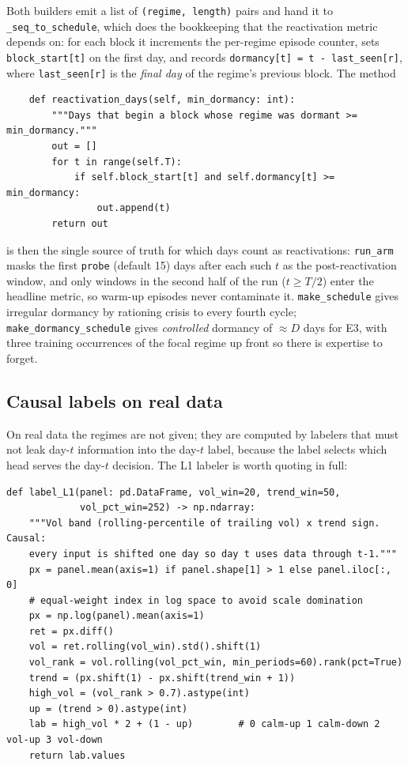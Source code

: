 \documentclass[11pt,a4paper]{article}
\theoremstyle{definition}
\theoremstyle{plain}
\begin{document}
Both builders emit a list of \texttt{(regime, length)} pairs and hand it to
\texttt{\_seq\_to\_schedule}, which does the bookkeeping that the
reactivation metric depends on: for each block it increments the per-regime
episode counter, sets \texttt{block\_start[t]} on the first day, and records
\texttt{dormancy[t] = t - last\_seen[r]}, where \texttt{last\_seen[r]} is
the \emph{final day} of the regime's previous block. The method
\begin{lstlisting}
    def reactivation_days(self, min_dormancy: int):
        """Days that begin a block whose regime was dormant >= min_dormancy."""
        out = []
        for t in range(self.T):
            if self.block_start[t] and self.dormancy[t] >= min_dormancy:
                out.append(t)
        return out
\end{lstlisting}
is then the single source of truth for which days count as reactivations:
\texttt{run\_arm} masks the first \texttt{probe} (default 15) days after
each such $t$ as the post-reactivation window, and only windows in the
second half of the run ($t \ge T/2$) enter the headline metric, so warm-up
episodes never contaminate it. \texttt{make\_schedule} gives irregular
dormancy by rationing crisis to every fourth cycle;
\texttt{make\_dormancy\_schedule} gives \emph{controlled} dormancy of
$\approx D$ days for E3, with three training occurrences of the focal
regime up front so there is expertise to forget.

\subsection{Causal labels on real data}
\label{sec:dd6-labels}

On real data the regimes are not given; they are computed by labelers that
must not leak day-$t$ information into the day-$t$ label, because the label
selects which head serves the day-$t$ decision. The L1 labeler is worth
quoting in full:

\begin{lstlisting}[caption={The L1 causal labeler (\texttt{realdata.py}).},label={lst:dd6-l1}]
def label_L1(panel: pd.DataFrame, vol_win=20, trend_win=50,
             vol_pct_win=252) -> np.ndarray:
    """Vol band (rolling-percentile of trailing vol) x trend sign. Causal:
    every input is shifted one day so day t uses data through t-1."""
    px = panel.mean(axis=1) if panel.shape[1] > 1 else panel.iloc[:, 0]
    # equal-weight index in log space to avoid scale domination
    px = np.log(panel).mean(axis=1)
    ret = px.diff()
    vol = ret.rolling(vol_win).std().shift(1)
    vol_rank = vol.rolling(vol_pct_win, min_periods=60).rank(pct=True)
    trend = (px.shift(1) - px.shift(trend_win + 1))
    high_vol = (vol_rank > 0.7).astype(int)
    up = (trend > 0).astype(int)
    lab = high_vol * 2 + (1 - up)        # 0 calm-up 1 calm-down 2 vol-up 3 vol-down
    return lab.values
\end{lstlisting}
\end{document}
